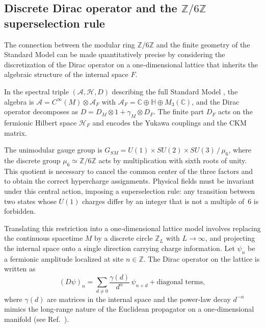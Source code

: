 \documentclass[11pt,a4paper]{article}
\newcommand{\Zmod}{\mathbb{Z}/6\mathbb{Z}}
\begin{document}
\subsection{Discrete Dirac operator and the \texorpdfstring{$\mathbb{Z}/6\mathbb{Z}$}{Z/6Z} superselection rule}
\label{sec:ncg_discrete}

The connection between the modular ring $\Zmod$ and the finite geometry of the Standard Model can be made quantitatively precise by considering the discretization of the Dirac operator on a one‑dimensional lattice that inherits the algebraic structure of the internal space $F$. 

In the spectral triple $(\mathcal{A}, \mathcal{H}, D)$ describing the full Standard Model \cite{Connes2008,Chamseddine2007}, the algebra is $\mathcal{A}=C^\infty(M)\otimes \mathcal{A}_F$ with $\mathcal{A}_F=\mathbb{C}\oplus\mathbb{H}\oplus M_3(\mathbb{C})$, and the Dirac operator decomposes as $D = D_M\otimes 1 + \gamma_M\otimes D_F$. The finite part $D_F$ acts on the fermionic Hilbert space $\mathcal{H}_F$ and encodes the Yukawa couplings and the CKM matrix.

The unimodular gauge group is $G_{SM}=U(1)\times SU(2)\times SU(3)\,/\,\mu_6$, where the discrete group $\mu_6\simeq\Zmod$ acts by multiplication with sixth roots of unity. This quotient is necessary to cancel the common center of the three factors and to obtain the correct hypercharge assignments. Physical fields must be invariant under this central action, imposing a superselection rule: any transition between two states whose $U(1)$ charges differ by an integer that is not a multiple of~6 is forbidden.

Translating this restriction into a one‑dimensional lattice model involves replacing the continuous spacetime $M$ by a discrete circle $\mathbb{Z}_L$ with $L\to\infty$, and projecting the internal space onto a single direction carrying charge information. Let $\psi_n$ be a fermionic amplitude localized at site $n\in\mathbb{Z}$. The Dirac operator on the lattice is written as
\begin{equation}
(D\psi)_n = \sum_{d\neq 0} \frac{\gamma(d)}{d^{\alpha}} \, \psi_{n+d} + \text{diagonal terms},
\end{equation}
where $\gamma(d)$ are matrices in the internal space and the power‑law decay $d^{-\alpha}$ mimics the long‑range nature of the Euclidean propagator on a one‑dimensional manifold (see Ref.~\cite{Mirlin1996}).
\end{document}
